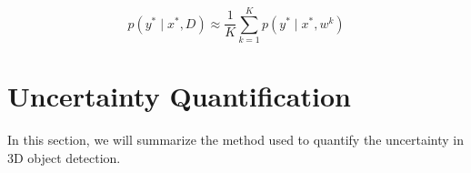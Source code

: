 \documentclass[10pt,twocolumn,letterpaper]{article}
\begin{document}
\begin{equation}
    \label{final_inference}
    p\left(y^{*} \mid x^{*}, D\right) \approx \frac{1}{K} \sum_{k=1}^{K} p\left(y^{*} \mid x^{*}, w^{k}\right)
\end{equation}
    
        
\section{Uncertainty Quantification}
In this section, we will summarize the method used to quantify the uncertainty in 3D object detection.
\end{document}
